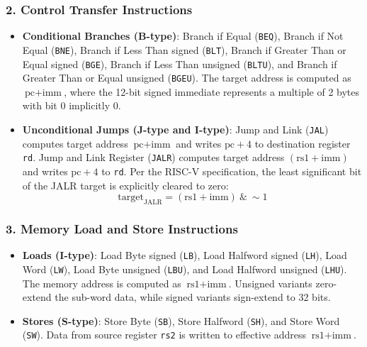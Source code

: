 \subsubsection{2. Control Transfer Instructions}
\begin{itemize}
    \item \textbf{Conditional Branches (B-type)}: Branch if Equal (\texttt{BEQ}), Branch if Not Equal (\texttt{BNE}), Branch if Less Than signed (\texttt{BLT}), Branch if Greater Than or Equal signed (\texttt{BGE}), Branch if Less Than unsigned (\texttt{BLTU}), and Branch if Greater Than or Equal unsigned (\texttt{BGEU}). The target address is computed as $\text{pc} + \text{imm}$, where the 12-bit signed immediate represents a multiple of 2 bytes with bit 0 implicitly 0.
    \item \textbf{Unconditional Jumps (J-type and I-type)}: Jump and Link (\texttt{JAL}) computes target address $\text{pc} + \text{imm}$ and writes $\text{pc} + 4$ to destination register \texttt{rd}. Jump and Link Register (\texttt{JALR}) computes target address $(\text{rs1} + \text{imm})$ and writes $\text{pc} + 4$ to \texttt{rd}. Per the RISC-V specification, the least significant bit of the JALR target is explicitly cleared to zero:
    \begin{equation}
        \text{target}_{\text{JALR}} = (\text{rs1} + \text{imm}) \ \& \ \sim 1
    \end{equation}
\end{itemize}

\subsubsection{3. Memory Load and Store Instructions}
\begin{itemize}
    \item \textbf{Loads (I-type)}: Load Byte signed (\texttt{LB}), Load Halfword signed (\texttt{LH}), Load Word (\texttt{LW}), Load Byte unsigned (\texttt{LBU}), and Load Halfword unsigned (\texttt{LHU}). The memory address is computed as $\text{rs1} + \text{imm}$. Unsigned variants zero-extend the sub-word data, while signed variants sign-extend to 32 bits.
    \item \textbf{Stores (S-type)}: Store Byte (\texttt{SB}), Store Halfword (\texttt{SH}), and Store Word (\texttt{SW}). Data from source register \texttt{rs2} is written to effective address $\text{rs1} + \text{imm}$.
\end{itemize}

